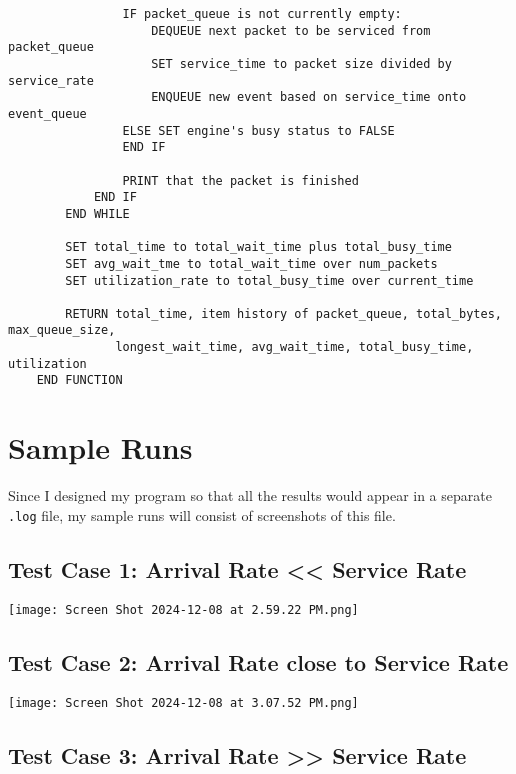 \documentclass{article}
\begin{document}
\begin{verbatim}
                IF packet_queue is not currently empty:
                    DEQUEUE next packet to be serviced from packet_queue
                    SET service_time to packet size divided by service_rate
                    ENQUEUE new event based on service_time onto event_queue
                ELSE SET engine's busy status to FALSE
                END IF

                PRINT that the packet is finished
            END IF
        END WHILE

        SET total_time to total_wait_time plus total_busy_time
        SET avg_wait_tme to total_wait_time over num_packets
        SET utilization_rate to total_busy_time over current_time

        RETURN total_time, item history of packet_queue, total_bytes, max_queue_size,
               longest_wait_time, avg_wait_time, total_busy_time, utilization
    END FUNCTION
\end{verbatim}

\section{Sample Runs}

Since I designed my program so that all the results would appear in a separate \verb|.log| file, my sample runs will consist of screenshots of this file.

\subsection{Test Case 1: Arrival Rate \textless\textless{ Service Rate}}

\begin{center}
    \texttt{[image: Screen Shot 2024-12-08 at 2.59.22 PM.png]}
\end{center}

\subsection{Test Case 2: Arrival Rate close to Service Rate}

\begin{center}
    \texttt{[image: Screen Shot 2024-12-08 at 3.07.52 PM.png]}
\end{center}

\subsection{Test Case 3: Arrival Rate {\textgreater\textgreater} Service Rate}
\end{document}
